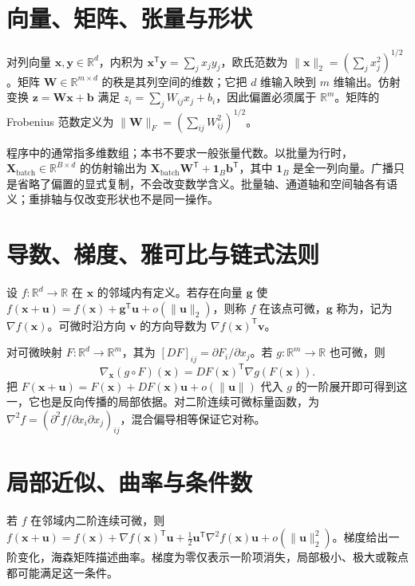 \documentclass[UTF8,12pt,a4paper,fontset=fandol]{ctexbook}
\begin{document}
\section{向量、矩阵、张量与形状}
对列向量 $\mathbf x,\mathbf y\in\mathbb R^d$，内积为 $\mathbf x^\mathsf T\mathbf y=\sum_jx_jy_j$，欧氏范数为 $\|\mathbf x\|_2=(\sum_jx_j^2)^{1/2}$。矩阵 $\mathbf W\in\mathbb R^{m\times d}$ 的秩是其列空间的维数；它把 $d$ 维输入映到 $m$ 维输出。仿射变换 $\mathbf z=\mathbf W\mathbf x+\mathbf b$ 满足 $z_i=\sum_jW_{ij}x_j+b_i$，因此偏置必须属于 $\mathbb R^m$。矩阵的 Frobenius 范数定义为 $\|\mathbf W\|_F=(\sum_{ij}W_{ij}^2)^{1/2}$。

程序中的通常指多维数组；本书不要求一般张量代数。以批量为行时，$\mathbf X_{\mathrm{batch}}\in\mathbb R^{B\times d}$ 的仿射输出为 $\mathbf X_{\mathrm{batch}}\mathbf W^\mathsf T+\mathbf1_B\mathbf b^\mathsf T$，其中 $\mathbf1_B$ 是全一列向量。广播只是省略了偏置的显式复制，不会改变数学含义。批量轴、通道轴和空间轴各有语义；重排轴与仅改变形状也不是同一操作。

\section{导数、梯度、雅可比与链式法则}
\begin{definition}[微分与梯度]
设 $f:\mathbb R^d\to\mathbb R$ 在 $\mathbf x$ 的邻域内有定义。若存在向量 $\mathbf g$ 使 $f(\mathbf x+\mathbf u)=f(\mathbf x)+\mathbf g^\mathsf T\mathbf u+o(\|\mathbf u\|_2)$，则称 $f$ 在该点可微，$\mathbf g$ 称为，记为 $\nabla f(\mathbf x)$。可微时沿方向 $\mathbf v$ 的方向导数为 $\nabla f(\mathbf x)^\mathsf T\mathbf v$。
\end{definition}
对可微映射 $F:\mathbb R^d\to\mathbb R^m$，其为 $[DF]_{ij}=\partial F_i/\partial x_j$。若 $g:\mathbb R^m\to\mathbb R$ 也可微，则
\begin{equation}
\nabla_{\mathbf x}(g\circ F)(\mathbf x)=DF(\mathbf x)^\mathsf T\nabla g(F(\mathbf x)).
\label{eq:dl-chain-rule}
\end{equation}
把 $F(\mathbf x+\mathbf u)=F(\mathbf x)+DF(\mathbf x)\mathbf u+o(\|\mathbf u\|)$ 代入 $g$ 的一阶展开即可得到这一，它也是反向传播的局部依据。对二阶连续可微标量函数，为 $\nabla^2f=(\partial^2f/\partial x_i\partial x_j)_{ij}$，混合偏导相等保证它对称。

\section{局部近似、曲率与条件数}
若 $f$ 在邻域内二阶连续可微，则 $f(\mathbf x+\mathbf u)=f(\mathbf x)+\nabla f(\mathbf x)^\mathsf T\mathbf u+\frac12\mathbf u^\mathsf T\nabla^2f(\mathbf x)\mathbf u+o(\|\mathbf u\|_2^2)$。梯度给出一阶变化，海森矩阵描述曲率。梯度为零仅表示一阶项消失，局部极小、极大或鞍点都可能满足这一条件。
\end{document}
